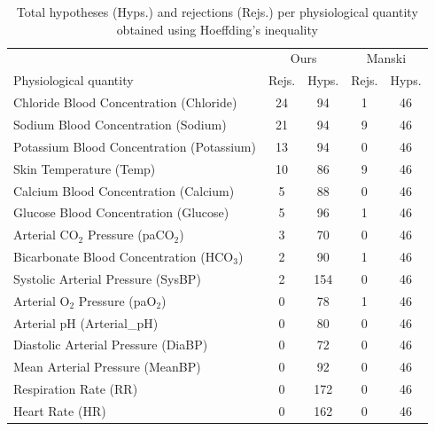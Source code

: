\begin{table}%
    \centering
\begin{footnotesize}
\begin{tabular}{l|cc|cc}
& \multicolumn{2}{c}{Ours} & \multicolumn{2}{c}{Manski} \\
                   Physiological quantity &  Rejs. &  Hyps. &  Rejs. &  Hyps. \\
\midrule
  Chloride Blood Concentration (Chloride) &            24 &            94 & 1 & 46 \\
      Sodium Blood Concentration (Sodium) &            21 &            94 & 9 & 46 \\
Potassium Blood Concentration (Potassium) &            13 &            94 & 0 & 46 \\
                  Skin Temperature (Temp) &            10 &            86 & 9 & 46 \\
    Calcium Blood Concentration (Calcium) &             5 &            88 & 0 & 46 \\
    Glucose Blood Concentration (Glucose) &             5 &            96 & 1 & 46 \\
      Arterial CO$_2$ Pressure (paCO$_2$) &             3 &            70 & 0 & 46 \\
Bicarbonate Blood Concentration (HCO$_3$) &             2 &            90 & 1 & 46 \\
       Systolic Arterial Pressure (SysBP) &             2 &           154 & 0 & 46 \\
        Arterial O$_2$ Pressure (paO$_2$) &             0 &            78 & 1 & 46 \\
                Arterial pH (Arterial\_pH) &             0 &            80 & 0 & 46 \\
      Diastolic Arterial Pressure (DiaBP) &             0 &            72 & 0 & 46 \\
          Mean Arterial Pressure (MeanBP) &             0 &            92 & 0 & 46 \\
                    Respiration Rate (RR) &             0 &           172 & 0 & 46 \\
                          Heart Rate (HR) &             0 &           162 & 0 & 46 \\
\bottomrule
\end{tabular}
\end{footnotesize}
    \caption{Total hypotheses (Hyps.) and rejections (Rejs.) per physiological quantity obtained using Hoeffding's inequality} \label{tab:hypotheses_hoeffding_full}
\end{table}

